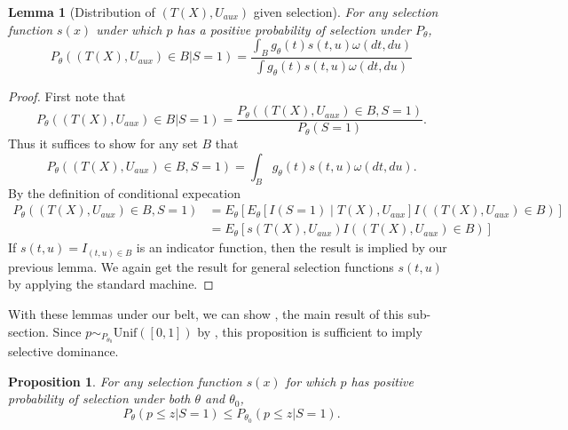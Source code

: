 \documentclass{article}
\newtheorem{lemma}{Lemma}
\newtheorem{proposition}{Proposition}
\begin{document}
\begin{appendix}
\begin{lemma}[Distribution of $(T(X), U_{aux})$ given selection]
    For any selection function $s(x)$ under which $p$ has a positive probability of selection under $P_{\theta}$, 
    \begin{equation*}
        P_{\theta}((T(X), U_{aux}) \in B| S = 1 ) = \frac{\int_{B} g_{\theta}(t)s(t, u) \omega(dt, du)}{ \int g_{\theta}(t) s(t, u) \omega(dt, du) }
    \end{equation*}
\end{lemma}

\begin{proof} First note that
    \begin{equation*}
        P_{\theta}( (T(X), U_{aux}) \in B | S= 1 ) = \frac{P_{\theta}((T(X), U_{aux}) \in B, S = 1) }{P_{\theta}(S = 1)}.
    \end{equation*} 
    Thus it suffices to show for any set $B$ that 
    \begin{equation*}
        P_{\theta}( (T(X), U_{aux}) \in B,  S= 1 ) = \int_B g_{\theta}(t) s(t, u) \omega(dt, du). 
    \end{equation*} 
    By the definition of conditional expecation
    \begin{align*}
        P_{\theta}( (T(X), U_{aux}) \in B,  S= 1 ) &= E_{\theta}[E_{\theta}[ I(S=1) \mid  T(X), U_{aux}] I((T(X), U_{aux}) \in B) ]\\
                                                   &= E_{\theta}[ s(T(X), U_{aux}) I((T(X), U_{aux}) \in B) ]
    \end{align*}
    If $s(t, u) = I_{(t, u) \in B}$ is an indicator function, then the result is implied by our previous lemma. We again get the result for general selection functions $s(t, u)$ by applying the standard machine. 
\end{proof}


With these lemmas under our belt, we can show , the main result of this sub-section. Since $p \sim_{P_{\theta_0}} \text{Unif}([0, 1])$ by , this proposition is sufficient to imply selective dominance. 

\begin{proposition}
    \label{prop:mlr_sel_dom}
    For any selection function $s(x)$ for which $p$ has positive probability of selection under both $\theta$ and $\theta_0$,  
    \begin{equation*}
        P_{\theta}(p \leq z | S = 1)  \leq P_{\theta_0}(p \leq z | S = 1).
    \end{equation*}
\end{proposition}


\end{appendix}
\end{document}

